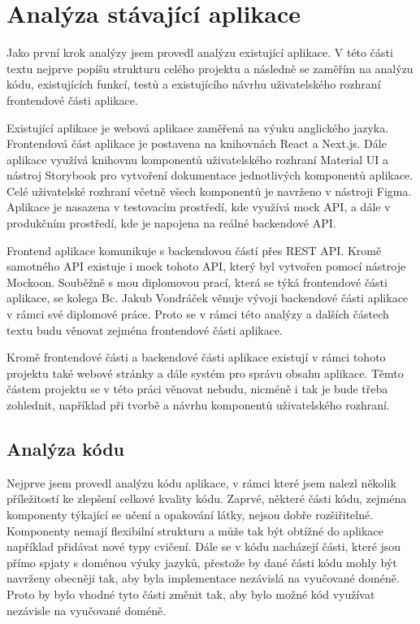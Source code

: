 \section{Analýza stávající aplikace}\label{sec:existing-solution}

Jako první krok analýzy jsem provedl analýzu existující aplikace. V této části textu nejprve popíšu strukturu celého projektu a následně se zaměřím na analýzu kódu, existujících funkcí, testů a existujícího návrhu uživatelského rozhraní frontendové části aplikace.

Existující aplikace je webová aplikace zaměřená na výuku anglického jazyka. Frontendová část aplikace je postavena na knihovnách React a Next.js. Dále aplikace využívá knihovnu komponentů uživatelského rozhraní Material UI a nástroj Storybook pro vytvoření dokumentace jednotlivých komponentů aplikace. Celé uživatelské rozhraní včetně všech komponentů je navrženo v nástroji Figma. Aplikace je nasazena v testovacím prostředí, kde využívá mock API, a dále v produkčním prostředí, kde je napojena na reálné backendové API. \cite{Jenicek2024BachelorThesis}

Frontend aplikace komunikuje s backendovou částí přes REST API. Kromě samotného API existuje i mock tohoto API, který byl vytvořen pomocí nástroje Mockoon. Souběžně s mou diplomovou prací, která se týká frontendové části aplikace, se kolega Bc. Jakub Vondráček věnuje vývoji backendové části aplikace v rámci své diplomové práce. Proto se v rámci této analýzy a dalších částech textu budu věnovat zejména frontendové části aplikace. \cite{Jenicek2024BachelorThesis}

Kromě frontendové části a backendové části aplikace existují v rámci tohoto projektu také webové stránky a dále systém pro správu obsahu aplikace. Těmto částem projektu se v této práci věnovat nebudu, nicméně i tak je bude třeba zohlednit, například při tvorbě a návrhu komponentů uživatelského rozhraní.

\subsection{Analýza kódu}

Nejprve jsem provedl analýzu kódu aplikace, v rámci které jsem nalezl několik příležitostí ke zlepšení celkové kvality kódu. Zaprvé, některé části kódu, zejména komponenty týkající se učení a opakování látky, nejsou dobře rozšiřitelné. Komponenty nemají flexibilní strukturu a může tak být obtížné do aplikace například přidávat nové typy cvičení. Dále se v kódu nacházejí části, které jsou přímo spjaty s doménou výuky jazyků, přestože by dané části kódu mohly být navrženy obecněji tak, aby byla implementace nezávislá na vyučované doméně. Proto by bylo vhodné tyto části změnit tak, aby bylo možné kód využívat nezávisle na vyučované doméně.

